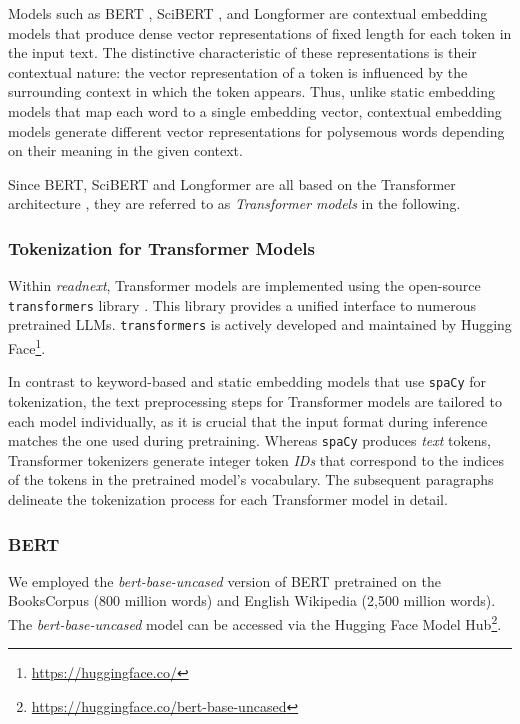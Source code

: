 Models such as BERT \cite{DevlinBERTPretraining2019}, SciBERT \cite{BeltagySciBERTPretrained2019}, and Longformer \cite{BeltagyLongformerLongDocument2020} are contextual embedding models that produce dense vector representations of fixed length for each token in the input text. The distinctive characteristic of these representations is their contextual nature: the vector representation of a token is influenced by the surrounding context in which the token appears.
Thus, unlike static embedding models that map each word to a single embedding vector, contextual embedding models generate different vector representations for polysemous words depending on their meaning in the given context.

Since BERT, SciBERT and Longformer are all based on the Transformer architecture \cite{VaswaniAttentionAll2017}, they are referred to as \emph{Transformer models} in the following.

\subsubsection*{Tokenization for Transformer Models}

Within \emph{readnext}, Transformer models are implemented using the open-source \texttt{transformers} library \cite{WolfHuggingFaceTransformers2020}. This library provides a unified interface to numerous pretrained \ac{LLMs}.
\texttt{transformers} is actively developed and maintained by Hugging Face\footnote{\url{https://huggingface.co/}}.

In contrast to keyword-based and static embedding models that use \texttt{spaCy} for tokenization, the text preprocessing steps for Transformer models are tailored to each model individually, as it is crucial that the input format during inference matches the one used during pretraining.
Whereas \texttt{spaCy} produces \emph{text} tokens, Transformer tokenizers generate integer token \emph{IDs} that correspond to the indices of the tokens in the pretrained model's vocabulary.
The subsequent paragraphs delineate the tokenization process for each Transformer model in detail.


\subsubsection*{BERT}

We employed the \emph{bert-base-uncased} version of BERT pretrained on the BooksCorpus (800 million words) and English Wikipedia (2,500 million words). The \emph{bert-base-uncased} model can be accessed via the Hugging Face Model Hub\footnote{\url{https://huggingface.co/bert-base-uncased}}.

